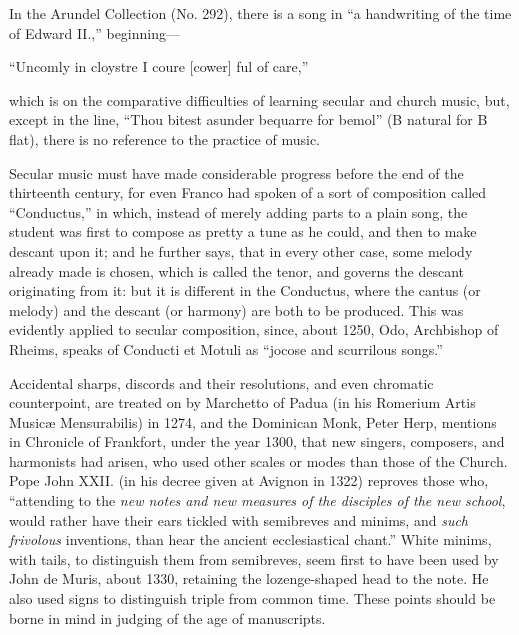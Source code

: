 

In the Arundel Collection (No. 292), there is a song in “a handwriting of
the time of Edward II.,” beginning—
\settowidth{\versewidth}{“Uncomly in cloystre I coure [cower] ful of care,”}
\begin{scverse}
“Uncomly in cloystre I coure [cower] ful of care,”
\end{scverse}
which is on the comparative difficulties of learning secular and church music,
but, except in the line, “Thou bitest asunder bequarre for bemol” (B natural
for B flat), there is no reference to the practice of music.

Secular music must have made considerable progress before the end of the
thirteenth century, for even Franco had spoken of a sort of composition called
“Conductus,” in which, instead of merely adding parts to a plain song, the student
was first to compose as pretty a tune as he could, and then to make descant
upon it; and he further says, that in every other case, some melody already made
is chosen, which is called the tenor, and governs the descant originating from it:
but it is different in the Conductus, where the cantus (or melody) and the descant
(or harmony) are both to be produced. This was evidently applied to secular
composition, since, about 1250, Odo, Archbishop of Rheims, speaks of Conducti et
Motuli as “jocose and scurrilous songs.”

Accidental sharps, discords and their resolutions, and even chromatic counterpoint,
are treated on by Marchetto of Padua (in his Romerium Artis Musicæ
Mensurabilis) in 1274, and the Dominican Monk, Peter Herp, mentions in
Chronicle of Frankfort, under the year 1300, that new singers, composers, and
harmonists had arisen, who used other scales or modes than those of the Church.
Pope John XXII. (in his decree given at Avignon in 1322) reproves those who,
“attending to the \textit{new notes and new measures of the disciples of the new school},
would rather have their ears tickled with semibreves and minims, and \textit{such frivolous}
inventions, than hear the ancient ecclesiastical chant.” White minims, with tails,
to distinguish them from semibreves, seem first to have been used by John de
Muris, about 1330, retaining the lozenge-shaped head to the note. He also used
signs to distinguish triple from common time. These points should be borne in
mind in judging of the age of manuscripts.

